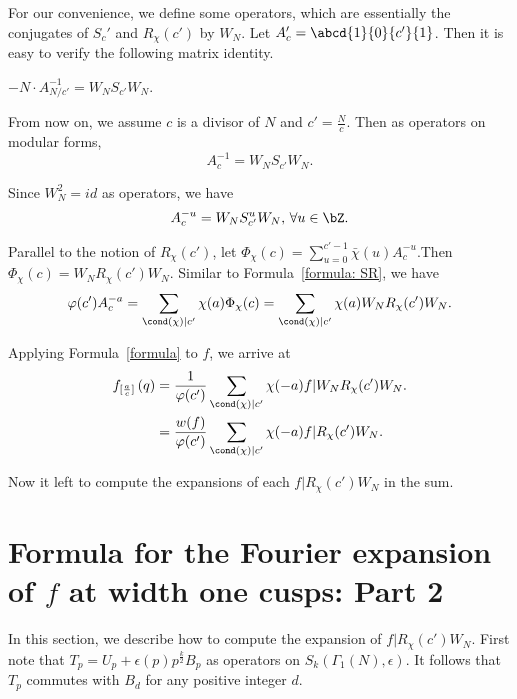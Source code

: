 \documentclass [11pt, proquest] {uwthesis}[2015/03/03]
\begin{document}
For our convenience, we define some operators, which are essentially the conjugates of $S_c'$ and $R_\chi(c')$ by $W_N$. Let $A_c' = \abcd{1}{0}{c'}{1}$.  Then it is easy to verify the following matrix identity.
\begin{Fact}
$-N \cdot A_{N/c'}^{-1} = W_N S_{c'} W_N$.
\end{Fact}

From now on, we assume $c$ is a divisor of $N$ and $c' = \frac{N}{c}$. Then as operators on modular forms, 
\[
	A_c^{-1} = W_N S_{c'} W_N.
\]

Since $W_N^2 = id$ as operators, we have
\[
	A_c^{-u} = W_N S_{c'}^u W_N, \, \forall u \in \bZ. 
\]

Parallel to the notion of $R_\chi(c')$, let $\Phi_\chi(c) = \sum_{u =0}^{c'-1} \bar{\chi}(u) A_c^{-u}$.Then $\Phi_\chi(c) = W_N R_\chi(c') W_N$. 
Similar to Formula~\ref{formula: SR}, we have
\begin{equation}
\label{formula}
	\varphi(c') A_c^{-a} = \sum_{\cond(\chi) \mid c'} \chi(a) \Phi_\chi(c) 
	 = \sum_{\cond(\chi) \mid c'} \chi(a) W_N R_\chi(c') W_N. 
\end{equation}

Applying Formula~\ref{formula} to $f$, we arrive at
\begin{eqnarray} \label{expansion0}
	f_{[\frac{a}{c}]} \left( q\right) &= \frac{1}{\varphi(c')}\sum_{\cond(\chi) \mid c'} \chi(-a) f| W_N R_\chi(c') W_N. \\ 
	&= \frac{w(f) }{\varphi(c')}\sum_{\cond(\chi) \mid c'} \chi(-a) f| R_\chi(c')  W_N. 
\end{eqnarray}

Now it left to compute the expansions of  each $f| R_\chi(c') W_N$ in the sum.

\section{Formula for the Fourier expansion of $f$ at width one cusps: Part 2}

In this section, we describe how to compute the expansion of $f| R_\chi(c') W_N$. First note that $T_p = U_p  + \epsilon(p) p^{\frac{k}{2}}B_p$ as operators on $S_k(\Gamma_1(N), \epsilon)$. It follows that $T_p$ commutes with $B_d$ for any positive integer $d$. 
 
\end{document}
